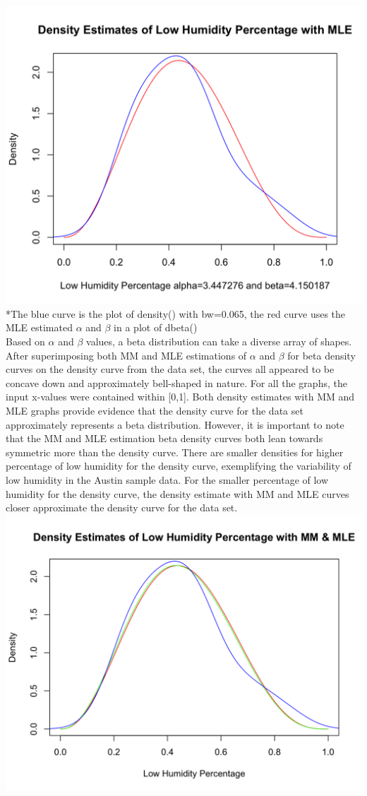\documentclass[12pt, letterpaper]{article}
\begin{document}
\includegraphics[scale=0.40]{austinweather_mle.png}
\footnotesize
\\ \**The blue curve is the plot of density() with bw=0.065, the red curve uses the MLE estimated ${\alpha}$ and ${\beta}$ in a plot of dbeta() \\
\normalsize 
Based on ${\alpha}$ and ${\beta}$ values, a beta distribution can take a diverse array of shapes. After superimposing both MM and MLE estimations of ${\alpha}$ and ${\beta}$ for beta density curves on the density curve from the data set, the curves all appeared to be concave down and approximately bell-shaped in nature. For all the graphs, the input x-values were contained within [0,1]. Both density estimates with MM and MLE graphs provide evidence that the density curve for the data set approximately represents a beta distribution. However, it is important to note that the MM and MLE estimation beta density curves both lean towards symmetric more than the density curve. There are smaller densities for higher percentage of low humidity for the density curve, exemplifying the variability of low humidity in the Austin sample data. For the smaller percentage of low humidity for the density curve, the density estimate with MM and MLE curves closer approximate the density curve for the data set. 
\includegraphics[scale=0.40]{austinweather_mmmle.png}
\end{document}
